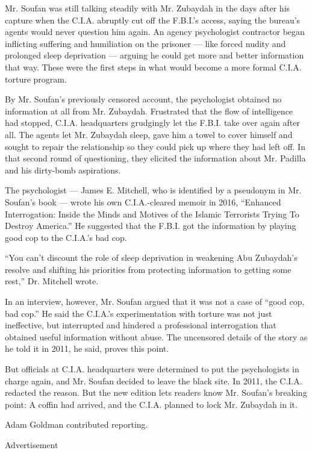 Mr. Soufan was still talking steadily with Mr. Zubaydah in the days
after his capture when the C.I.A. abruptly cut off the F.B.I.'s access,
saying the bureau's agents would never question him again. An agency
psychologist contractor began inflicting suffering and humiliation on
the prisoner --- like forced nudity and prolonged sleep deprivation ---
arguing he could get more and better information that way. These were
the first steps in what would become a more formal C.I.A. torture
program.

By Mr. Soufan's previously censored account, the psychologist obtained
no information at all from Mr. Zubaydah. Frustrated that the flow of
intelligence had stopped, C.I.A. headquarters grudgingly let the F.B.I.
take over again after all. The agents let Mr. Zubaydah sleep, gave him a
towel to cover himself and sought to repair the relationship so they
could pick up where they had left off. In that second round of
questioning, they elicited the information about Mr. Padilla and his
dirty-bomb aspirations.

The psychologist --- James E. Mitchell, who is identified by a pseudonym
in Mr. Soufan's book --- wrote his own C.I.A.-cleared memoir in 2016,
``Enhanced Interrogation: Inside the Minds and Motives of the Islamic
Terrorists Trying To Destroy America.'' He suggested that the F.B.I. got
the information by playing good cop to the C.I.A.'s bad cop.

``You can't discount the role of sleep deprivation in weakening Abu
Zubaydah's resolve and shifting his priorities from protecting
information to getting some rest,'' Dr. Mitchell wrote.

In an interview, however, Mr. Soufan argued that it was not a case of
``good cop, bad cop.'' He said the C.I.A.'s experimentation with torture
was not just ineffective, but interrupted and hindered a professional
interrogation that obtained useful information without abuse. The
uncensored details of the story as he told it in 2011, he said, proves
this point.

But officials at C.I.A. headquarters were determined to put the
psychologists in charge again, and Mr. Soufan decided to leave the black
site. In 2011, the C.I.A. redacted the reason. But the new edition lets
readers know Mr. Soufan's breaking point: A coffin had arrived, and the
C.I.A. planned to lock Mr. Zubaydah in it.

Adam Goldman contributed reporting.

Advertisement


